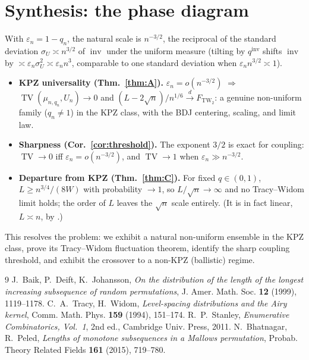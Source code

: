 \documentclass[12pt]{article}
\theoremstyle{definition}
\DeclareMathOperator{\inv}{inv}
\DeclareMathOperator{\TV}{TV}
\newcommand{\TW}{\mathrm{TW}_2}
\newcommand{\eps}{\varepsilon}
\begin{document}
\section{Synthesis: the phase diagram}\label{sec:synth}
With $\eps_n=1-q_n$, the natural scale is $n^{-3/2}$, the reciprocal of the standard
deviation $\sigma_U\asymp n^{3/2}$ of $\inv$ under the uniform measure (tilting by
$q^{\inv}$ shifts $\inv$ by $\asymp\eps_n\sigma_U^2\asymp\eps_n n^3$, comparable to one
standard deviation when $\eps_n n^{3/2}\asymp1$).
\begin{itemize}
\item \textbf{KPZ universality (Thm.~\ref{thm:A}).} $\eps_n=o(n^{-3/2})$ $\Rightarrow$
$\TV(\mu_{n,q_n},U_n)\to0$ and $(L-2\sqrt n)/n^{1/6}\xrightarrow{d}F_{\TW}$: a genuine
non-uniform family ($q_n\ne1$) in the KPZ class, with the BDJ centering, scaling, and
limit law.
\item \textbf{Sharpness (Cor.~\ref{cor:threshold}).} The exponent $3/2$ is exact for coupling:
$\TV\to0$ iff $\eps_n=o(n^{-3/2})$, and $\TV\to1$ when $\eps_n\gg n^{-3/2}$.
\item \textbf{Departure from KPZ (Thm.~\ref{thm:C}).} For fixed $q\in(0,1)$,
$L\ge n^{3/4}/(8W)$ with probability $\to1$, so $L/\sqrt n\to\infty$ and no Tracy--Widom
limit holds; the order of $L$ leaves the $\sqrt n$ scale entirely. (It is in fact linear,
$L\asymp n$, by \cite{BP}.)
\end{itemize}
This resolves the problem: we exhibit a natural non-uniform ensemble in the KPZ class,
prove its Tracy--Widom fluctuation theorem, identify the sharp coupling threshold, and
exhibit the crossover to a non-KPZ (ballistic) regime.

\begin{thebibliography}{9}
 J.~Baik, P.~Deift, K.~Johansson, \emph{On the distribution of the length
of the longest increasing subsequence of random permutations}, J. Amer. Math. Soc.
\textbf{12} (1999), 1119--1178.
 C.~A.~Tracy, H.~Widom, \emph{Level-spacing distributions and the Airy
kernel}, Comm. Math. Phys. \textbf{159} (1994), 151--174.
 R.~P.~Stanley, \emph{Enumerative Combinatorics, Vol.~1}, 2nd ed.,
Cambridge Univ. Press, 2011.
 N.~Bhatnagar, R.~Peled, \emph{Lengths of monotone subsequences in a
Mallows permutation}, Probab. Theory Related Fields \textbf{161} (2015), 719--780.
\end{thebibliography}
\end{document}
